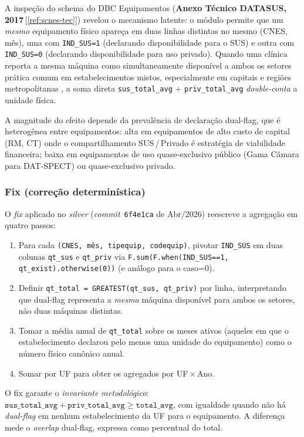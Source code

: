 \documentclass[12pt,a4paper,oneside]{article}
\begin{document}
A inspeção do schema do DBC Equipamentos
(\textbf{Anexo Técnico DATASUS, 2017}\,[\ref{ref:scnes-tec}]) revelou
o mecanismo latente: o módulo permite que um \textit{mesmo}
equipamento físico apareça em duas linhas distintas no mesmo
(CNES, mês), uma com \texttt{IND\_SUS=1} (declarando disponibilidade
para o SUS) e outra com \texttt{IND\_SUS=0} (declarando
disponibilidade para uso privado). Quando uma clínica reporta a mesma
máquina como simultaneamente disponível a ambos os setores
\textemdash{} prática comum em estabelecimentos mistos, especialmente
em capitais e regiões metropolitanas \textemdash{}, a soma direta
\texttt{sus\_total\_avg} $+$ \texttt{priv\_total\_avg}
\textit{double-conta} a unidade física.

A magnitude do efeito depende da prevalência de declaração dual-flag,
que é heterogênea entre equipamentos: alta em equipamentos de
alto custo de capital (RM, CT) onde o compartilhamento SUS\,/\,Privado
é estratégia de viabilidade financeira; baixa em equipamentos de
uso quase-exclusivo público (Gama Câmara para DAT-SPECT) ou
quase-exclusivo privado.

\subsubsection{Fix (correção determinística)}

O \textit{fix} aplicado no \textit{silver}
(\textit{commit}~\texttt{6f4e1ca} de Abr/2026) reescreve a agregação
em quatro passos:

\begin{enumerate}
\item Para cada \texttt{(CNES, mês, tipequip, codequip)}, pivotar
\texttt{IND\_SUS} em duas colunas \texttt{qt\_sus} e \texttt{qt\_priv}
via \texttt{F.sum(F.when(IND\_SUS==1, qt\_exist).otherwise(0))} (e
análogo para o caso=0).
\item Definir
\texttt{qt\_total = GREATEST(qt\_sus, qt\_priv)} por linha,
interpretando que dual-flag representa a \textit{mesma} máquina
disponível para ambos os setores, não duas máquinas distintas.
\item Tomar a média anual de \texttt{qt\_total} sobre os meses
ativos (aqueles em que o estabelecimento declarou pelo menos uma
unidade do equipamento) como o número físico canônico anual.
\item Somar por UF para obter os agregados por UF\,$\times$\,Ano.
\end{enumerate}

\noindent
O fix garante o \textit{invariante metodológico}:
$\texttt{sus\_total\_avg} + \texttt{priv\_total\_avg} \geq
\texttt{total\_avg}$, com igualdade quando não há \textit{dual-flag}
em nenhum estabelecimento da UF para o equipamento. A diferença
mede o \textit{overlap} dual-flag, expressa como percentual do total.
\end{document}
